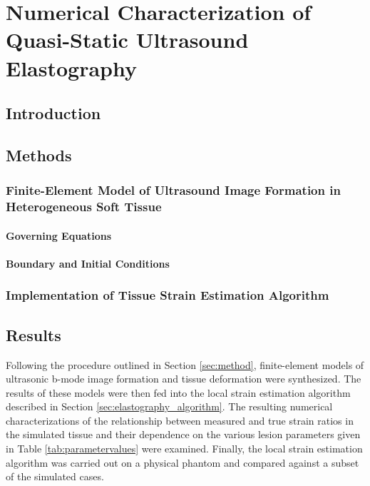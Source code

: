 \chapter{Numerical Characterization of Quasi-Static Ultrasound Elastography}
	\section{Introduction}
		\lipsum[1]
	\section{Methods}
		\lipsum[1]
		\subsection{Finite-Element Model of Ultrasound Image Formation in Heterogeneous Soft Tissue}
			\lipsum[1]
			\subsubsection{Governing Equations}
				\lipsum[1]
			\subsubsection{Boundary and Initial Conditions}
				\lipsum[1]
		\subsection{Implementation of Tissue Strain Estimation Algorithm}
			\lipsum[1]
	\section{Results}
		Following the procedure outlined in Section \ref{sec:method}, finite-element models of ultrasonic b-mode image formation and tissue deformation were synthesized. The results of these models were then fed into the local strain estimation algorithm described in Section \ref{sec:elastography_algorithm}. The resulting numerical characterizations of the relationship between measured and true strain ratios in the simulated tissue and their dependence on the various lesion parameters given in Table \ref{tab:parametervalues} were examined. Finally, the local strain estimation algorithm was carried out on a physical phantom and compared against a subset of the simulated cases.

